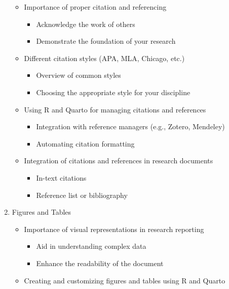 \documentclass[
  letterpaper,
]{latex/krantz}
\providecommand{\tightlist}{%
  \setlength{\itemsep}{0pt}\setlength{\parskip}{0pt}}\usepackage{longtable,booktabs,array}
\begin{document}
\begin{enumerate}
  \begin{itemize}
  \tightlist
  \item
    Importance of proper citation and referencing

    \begin{itemize}
    \tightlist
    \item
      Acknowledge the work of others
    \item
      Demonstrate the foundation of your research
    \end{itemize}
  \item
    Different citation styles (APA, MLA, Chicago, etc.)

    \begin{itemize}
    \tightlist
    \item
      Overview of common styles
    \item
      Choosing the appropriate style for your discipline
    \end{itemize}
  \item
    Using R and Quarto for managing citations and references

    \begin{itemize}
    \tightlist
    \item
      Integration with reference managers (e.g., Zotero, Mendeley)
    \item
      Automating citation formatting
    \end{itemize}
  \item
    Integration of citations and references in research documents

    \begin{itemize}
    \tightlist
    \item
      In-text citations
    \item
      Reference list or bibliography
    \end{itemize}
  \end{itemize}
\item
  Figures and Tables

  \begin{itemize}
  \tightlist
  \item
    Importance of visual representations in research reporting

    \begin{itemize}
    \tightlist
    \item
      Aid in understanding complex data
    \item
      Enhance the readability of the document
    \end{itemize}
  \item
    Creating and customizing figures and tables using R and Quarto


\end{itemize}
\end{enumerate}
\end{document}
